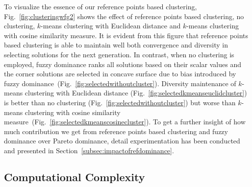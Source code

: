\documentclass[review]{elsarticle}
\begin{document}
To visualize the essence of our reference points based clustering, Fig.~\ref{fig:clusteringwfg2} shows the effect of  reference points based clustering, no clustering, $k$-means clustering with Euclidean distance and  $k$-means clustering with cosine similarity measure. It is evident from this figure that reference points based clustering is able to maintain well both convergence and diversity in selecting solutions for the next generation. In contrast, when no clustering is employed, fuzzy dominance ranks all solutions based on their scalar values and the corner solutions are selected in concave surface due to bias introduced by fuzzy dominance~(Fig.~\ref{fig:selectedwithoutcluster}). 
Diversity maintenance of $k$-means clustering with Euclidean distance (Fig.~\ref{fig:selectedkmeanseuclidcluster}) is better than no clustering (Fig.~\ref{fig:selectedwithoutcluster}) but worse than $k$-means clustering with cosine similarity measure~(Fig.~\ref{fig:selectedkmeanscosinecluster}). To get a further insight of how much contribution we get from reference points based clustering and fuzzy dominance over Pareto dominance, detail experimentation has been conducted and presented in Section~\ref{subsec:impactofrefdominance}.

%   		
%	

\subsection{Computational Complexity}
\end{document}
